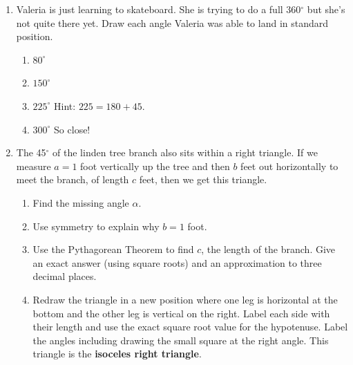 \begin{enumerate}
\item %
Valeria is just learning to skateboard. She is trying to do a full 360$^\circ$ but she's not quite there yet.  Draw each angle Valeria was able to land in standard position.
\begin{enumerate}
    \item $80^\circ$
    \item $150^\circ$
    \item $225^\circ$  Hint: $225 = 180 + 45$.
    \item $300^\circ$  So close!
\end{enumerate}
\item %
The 45$^\circ$ of the linden tree branch also sits within a right triangle.  If we measure $a=1$ foot vertically up the tree and then $b$ feet out horizontally to meet the branch, of length $c$ feet, then we get this triangle.

\begin{center}
\end{center}

\begin{enumerate}
    \item Find the missing angle $\alpha$.
    \item Use symmetry to explain why $b=1$ foot.   
    \item Use the Pythagorean Theorem to find $c$, the length of the branch.  Give an exact answer (using square roots) and an approximation to three decimal places.
    \item Redraw the triangle in a new position where one leg is horizontal at the bottom and the other leg is vertical on the right.  Label each side with their length and use the exact square root value for the hypotenuse. Label the angles including drawing the small square at the right angle. This triangle is the \textbf{isoceles right triangle}.
\end{enumerate}


\end{enumerate}
